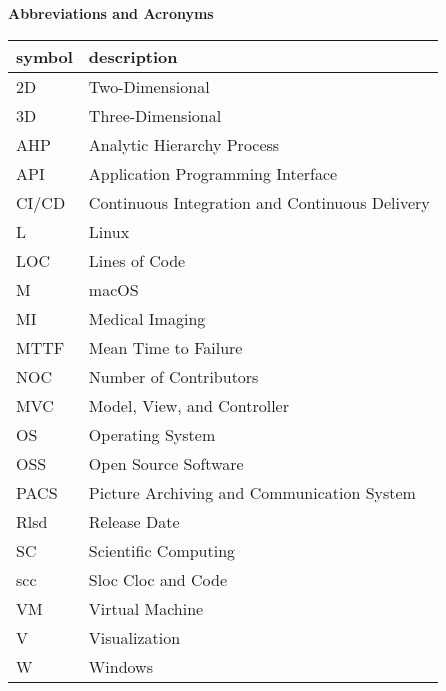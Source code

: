 \begin{center}
\textbf{\large Abbreviations and Acronyms}
\end{center}

\begin{table}[H]
\centering
\begin{tabular}{ll} 
\hline
\textbf{symbol} & \textbf{description}\\
\hline		
2D & Two-Dimensional\\
3D & Three-Dimensional\\
AHP & Analytic Hierarchy Process\\
API & Application Programming Interface\\
CI/CD & Continuous Integration and Continuous Delivery\\
L & Linux \\
LOC & Lines of Code\\
M & macOS\\
MI & Medical Imaging\\
MTTF & Mean Time to Failure\\
NOC &  Number of Contributors\\
MVC & Model, View, and Controller\\
OS & Operating System\\
OSS & Open Source Software\\
PACS & Picture Archiving and Communication System\\
Rlsd & Release Date\\
SC & Scientific Computing\\
scc & Sloc Cloc and Code\\
VM & Virtual Machine\\
V & Visualization\\
W & Windows\\
\hline		
\end{tabular}\\
\end{table}
